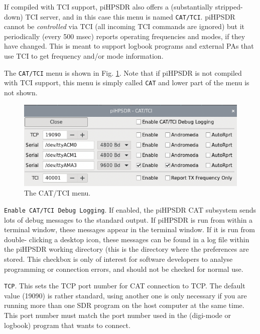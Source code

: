 \documentclass[12pt]{book}
\def\rett#1{\texttt{\color{red}#1}}
\def\bltt#1{\texttt{\color{blue}#1}}
\def\pH{pi\-HPSDR\xspace}
\begin{document}
If compiled  with TCI  support, \pH also offers a (substantially  stripped-down) TCI server, and in this
case this menu is named \bltt{CAT/TCI}. \pH cannot
be \textit{controlled} via TCI (all incoming TCI commands are  ignored) but it periodically (every 500 msec)
reports operating frequencies  and modes, if they have changed. This is meant  to support  logbook programs
and external PAs that use TCI  to get frequency and/or mode information.

The \bltt{CAT/TCI} menu is shown in Fig. \ref{fig:CATmenu}. Note that if \pH  is  not compiled
with TCI support,  this menu is simply called  \bltt{CAT} and lower part  of the menu is not shown.

\begin{figure}[ht]
\center
\includegraphics[width=12cm]{CATmenu.png}
\caption{The CAT/TCI  menu.}
\label{fig:CATmenu}
\end{figure}

\rett{Enable CAT/TCI Debug Logging}. If enabled, the \pH CAT subsystem sends lots of debug messages to the standard output. If
\pH is run
from within a terminal window, these messages appear in the terminal window. If it is run from double-
clicking a desktop icon,
these messages can be found in a log file within the \pH working directory (this is the directory where
the preferences
are stored. This checkbox is only of interest for software developers to analyse programming or connection
errors, and should
not be checked for normal use.

\rett{TCP}. This sets the TCP port number for CAT connection to TCP. The default value (19090)
is rather standard, using another one is only necessary if you are running more than one
SDR program on the host computer at the same time.
This port number must match the port number used in the (digi-mode or logbook) program that wants to connect.
\end{document}

